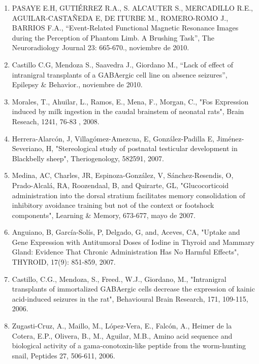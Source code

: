 \begin{enumerate}
\item PASAYE E.H, GUTIÉRREZ R.A., S. ALCAUTER S., MERCADILLO R.E., AGUILAR-CASTAÑEDA E, DE ITURBE M., ROMERO-ROMO J., BARRIOS 
F.A., “Event-Related Functional Magnetic Resonance Images during the Perception of Phantom Limb. A Brushing Task”, The 
Neuroradiology Journal 23: 665-670.,    noviembre de 2010.

\item Castillo C.G, Mendoza S., Saavedra J., Giordano M., “Lack of effect of intranigral transplants of a GABAergic cell line 
on absence seizures”, Epilepsy \& Behavior.,    noviembre de 2010.

\item Morales, T., Ahuilar, L., Ramos, E., Mena, F., Morgan, C., "Fos Expression induced by milk ingestion in the caudal 
brainstem of neonatal rats", Brain Reseach, 1241, 76-83 ,    2008.

\item Herrera-Alarcón, J, Villagómez-Amezcua, E, González-Padilla E, Jiménez-Severiano, H, "Stereological study of postnatal 
testicular development in Blackbelly sheep", Theriogenology, 582591,    2007.

\item Medina, AC, Charles, JR, Espinoza-González, V, Sánchez-Resendis, O, Prado-Alcalá, RA, Roozendaal, B, and Quirarte, GL, 
"Glucocorticoid administration into the dorsal stratium facilitates memory consolidation of inhibitory avoidance training but 
not of the context or footshock components", Learning \& Memory, 673-677,    mayo de 2007.

\item Anguiano, B, García-Solís, P, Delgado, G, and, Aceves, CA, "Uptake and Gene Expression with Antitumoral Doses of Iodine 
in Thyroid and Mammary Gland: Evidence That Chronic Administration Has No Harmful Effects", THYROID, 17(9): 851-859, 2007.

\item Castillo, C.G., Mendoza, S., Freed., W.J., Giordano, M., "Intranigral transplants of immortalized GABAergic cells 
decrease the expression of kainic acid-induced seizures in the rat", Behavioural Brain Research, 171, 109-115, 2006.

\item Zugasti-Cruz, A., Maillo, M., López-Vera, E., Falcón, A., Heimer de la Cotera, E.P., Olivera, B., M., Aguilar, M.B., 
Amino acid sequence and biological activity of a gama-conotoxin-like peptide from the worm-hunting snail, Peptides 27, 
506-611,    2006.


\end{enumerate}

